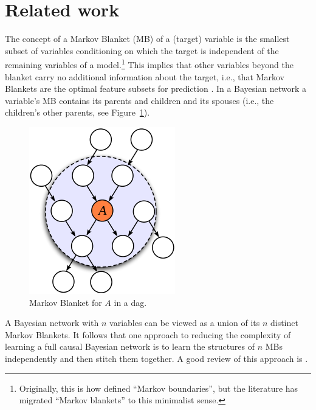 \documentclass{svmult}
\begin{document}
\section{Related work} 
\label{sec:related}
The concept of a Markov Blanket (MB) of a (target) variable is the
smallest subset of variables conditioning on which the target is
independent of the remaining variables of a
model.\footnote{Originally, this is how \citet{pearl1988probabilistic}
  defined ``Markov boundaries'', but the literature has migrated
  ``Markov blankets'' to this minimalist sense.}  This implies that
other variables beyond the blanket carry no additional information
about the target, i.e., that Markov Blankets are the optimal feature
subsets for prediction
\citep{koller1996toward,cooper1997evaluation,cheng2001kdd}. In a
Bayesian network a variable's MB contains its parents and children and
its spouses (i.e., the children's other parents, see
Figure~\ref{fg:MB}).

\begin{figure}[htb]
  \centering
    \includegraphics[scale=0.6]{figures/MB.png}
  \caption{Markov Blanket for $A$ in a dag.}
  \label{fg:MB}
\end{figure}

A Bayesian network with $n$ variables can be viewed as a union of its $n$ 
distinct Markov Blankets. It follows that one approach to reducing the
complexity of learning a full causal Bayesian network is to learn the
structures of $n$  MBs independently and then stitch them together. A
good review of this approach is \citet{aliferis2010localb}.

\end{document}
